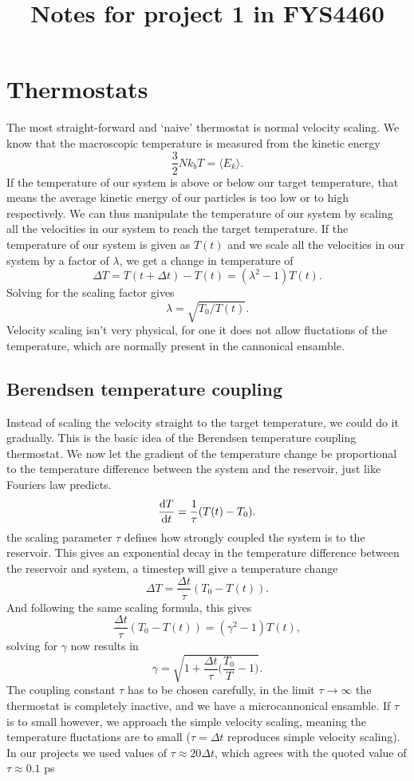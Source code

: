 \documentclass[a4paper, 11pt, notitlepage, english]{article}
\author{}
\title{Notes for project 1 in FYS4460}
\renewcommand{\d}{{\rm d}}
\renewcommand{\b}{\bigg}
\begin{document}
\section*{Thermostats}

The most straight-forward and `naive' thermostat is normal velocity scaling. We know that the macroscopic temperature is measured from the kinetic energy
$$\frac{3}{2}N k_b T = \langle E_k \rangle.$$
If the temperature of our system is above or below our target temperature, that means the average kinetic energy of our particles is too low or to high respectively. We can thus manipulate the temperature of our system by scaling all the velocities in our system to reach the target temperature. If the temperature of our system is given as $T(t)$ and we scale all the velocities in our system by a factor of $\lambda$, we get a change in temperature of
$$\Delta T = T(t+\Delta t) - T(t) = (\lambda^2 - 1)T(t).$$
Solving for the scaling factor gives
$$\lambda = \sqrt{T_0/T(t)}.$$
Velocity scaling isn't very physical, for one it does not allow fluctations of the temperature, which are normally present in the cannonical ensamble.

\subsection*{Berendsen temperature coupling}

Instead of scaling the velocity straight to the target temperature, we could do it gradually. This is the basic idea of the Berendsen temperature coupling thermostat. We now let the gradient of the temperature change be proportional to the temperature difference between the system and the reservoir, just like Fouriers law predicts. 
$$\frac{\d T}{\d t} = \frac{1}{\tau}(T(t) - T_0).$$
the scaling parameter $\tau$ defines how strongly coupled the system is to the reservoir. This gives an exponential decay in the temperature difference between the reservoir and system, a timestep will give a temperature change
$$\Delta T = \frac{\Delta t}{\tau}(T_0 - T(t)).$$
And following the same scaling formula, this gives
$$\frac{\Delta t}{\tau}(T_0 - T(t)) = (\gamma^2 - 1)T(t),$$
solving for $\gamma$ now results in
$$\gamma = \sqrt{1 + \frac{\Delta t}{\tau}\b(\frac{T_0}{T} - 1\b)}.$$
The coupling constant $\tau$ has to be chosen carefully, in the limit $\tau \to \infty$ the thermostat is completely inactive, and we have a microcannonical ensamble. If $\tau$ is to small however, we approach the simple velocity scaling, meaning the temperature fluctations are to small ($\tau = \Delta t$ reproduces simple velocity scaling). In our projects we used values of $\tau \approx 20 \Delta t$, which agrees with the quoted value of $\tau \approx 0.1$ ps
\end{document}
